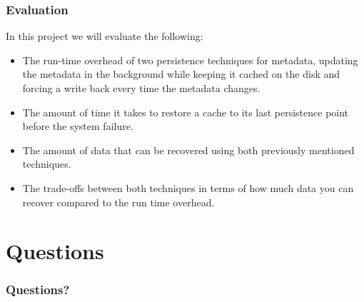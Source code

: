\documentclass{beamer}
\begin{document}
\begin{frame}
  \frametitle{Evaluation}

  In this project we will evaluate the following:
  \begin{itemize}
    \item The run-time overhead of two persistence techniques for
    metadata, updating the metadata in the background while keeping it
    cached on the disk and forcing a write back every time the
    metadata changes.
    \item The amount of time it takes to restore a cache to its last
    persistence point before the system failure.
    \item The amount of data that can be recovered using both
    previously mentioned techniques.
    \item The trade-offs between both techniques in terms of how much
    data you can recover compared to the run time overhead.
  \end{itemize}
 
\end{frame}


\section{Questions}

\begin{frame}
  \frametitle{Questions?}
\end{frame}

\end{document}
